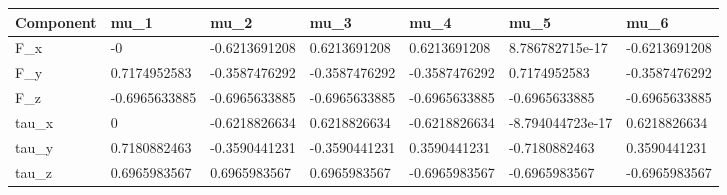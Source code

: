 \begin{tabular}{@{}lllllll@{}}
\toprule
Component & mu\_1 & mu\_2 & mu\_3 & mu\_4 & mu\_5 & mu\_6 \\
\midrule
F\_x & -0 & -0.6213691208 & 0.6213691208 & 0.6213691208 & 8.786782715e-17 & -0.6213691208 \\
F\_y & 0.7174952583 & -0.3587476292 & -0.3587476292 & -0.3587476292 & 0.7174952583 & -0.3587476292 \\
F\_z & -0.6965633885 & -0.6965633885 & -0.6965633885 & -0.6965633885 & -0.6965633885 & -0.6965633885 \\
tau\_x & 0 & -0.6218826634 & 0.6218826634 & -0.6218826634 & -8.794044723e-17 & 0.6218826634 \\
tau\_y & 0.7180882463 & -0.3590441231 & -0.3590441231 & 0.3590441231 & -0.7180882463 & 0.3590441231 \\
tau\_z & 0.6965983567 & 0.6965983567 & 0.6965983567 & -0.6965983567 & -0.6965983567 & -0.6965983567 \\
\bottomrule
\end{tabular}
